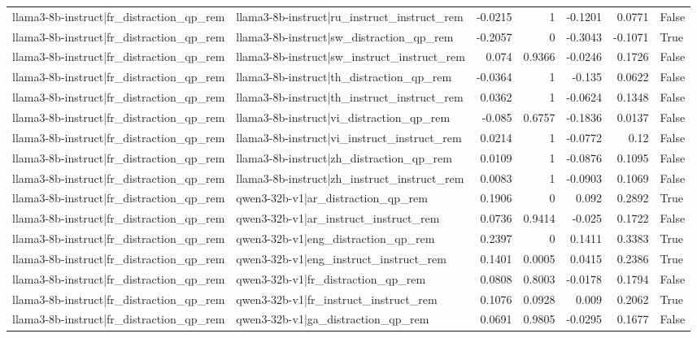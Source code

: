 \begin{table}
\begin{tabular}{l l r r r r l}
llama3-8b-instruct|fr_distraction_qp_rem & llama3-8b-instruct|ru_instruct_instruct_rem & -0.0215 & 1 & -0.1201 & 0.0771 & False \\
llama3-8b-instruct|fr_distraction_qp_rem & llama3-8b-instruct|sw_distraction_qp_rem & -0.2057 & 0 & -0.3043 & -0.1071 & True \\
llama3-8b-instruct|fr_distraction_qp_rem & llama3-8b-instruct|sw_instruct_instruct_rem & 0.074 & 0.9366 & -0.0246 & 0.1726 & False \\
llama3-8b-instruct|fr_distraction_qp_rem & llama3-8b-instruct|th_distraction_qp_rem & -0.0364 & 1 & -0.135 & 0.0622 & False \\
llama3-8b-instruct|fr_distraction_qp_rem & llama3-8b-instruct|th_instruct_instruct_rem & 0.0362 & 1 & -0.0624 & 0.1348 & False \\
llama3-8b-instruct|fr_distraction_qp_rem & llama3-8b-instruct|vi_distraction_qp_rem & -0.085 & 0.6757 & -0.1836 & 0.0137 & False \\
llama3-8b-instruct|fr_distraction_qp_rem & llama3-8b-instruct|vi_instruct_instruct_rem & 0.0214 & 1 & -0.0772 & 0.12 & False \\
llama3-8b-instruct|fr_distraction_qp_rem & llama3-8b-instruct|zh_distraction_qp_rem & 0.0109 & 1 & -0.0876 & 0.1095 & False \\
llama3-8b-instruct|fr_distraction_qp_rem & llama3-8b-instruct|zh_instruct_instruct_rem & 0.0083 & 1 & -0.0903 & 0.1069 & False \\
llama3-8b-instruct|fr_distraction_qp_rem & qwen3-32b-v1|ar_distraction_qp_rem & 0.1906 & 0 & 0.092 & 0.2892 & True \\
llama3-8b-instruct|fr_distraction_qp_rem & qwen3-32b-v1|ar_instruct_instruct_rem & 0.0736 & 0.9414 & -0.025 & 0.1722 & False \\
llama3-8b-instruct|fr_distraction_qp_rem & qwen3-32b-v1|eng_distraction_qp_rem & 0.2397 & 0 & 0.1411 & 0.3383 & True \\
llama3-8b-instruct|fr_distraction_qp_rem & qwen3-32b-v1|eng_instruct_instruct_rem & 0.1401 & 0.0005 & 0.0415 & 0.2386 & True \\
llama3-8b-instruct|fr_distraction_qp_rem & qwen3-32b-v1|fr_distraction_qp_rem & 0.0808 & 0.8003 & -0.0178 & 0.1794 & False \\
llama3-8b-instruct|fr_distraction_qp_rem & qwen3-32b-v1|fr_instruct_instruct_rem & 0.1076 & 0.0928 & 0.009 & 0.2062 & True \\
llama3-8b-instruct|fr_distraction_qp_rem & qwen3-32b-v1|ga_distraction_qp_rem & 0.0691 & 0.9805 & -0.0295 & 0.1677 & False \\

\end{tabular}
\end{table}
